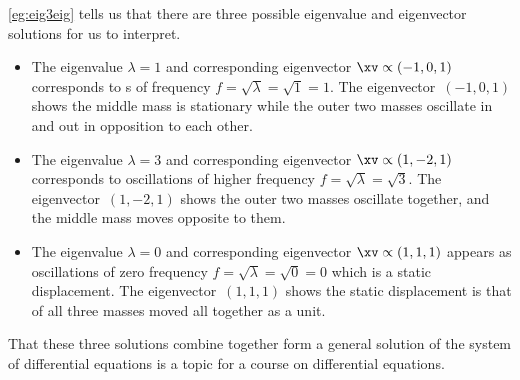 \begin{reduce}
\begin{example}
\cref{eg:eig3eig} tells us that there are three possible eigenvalue and eigenvector solutions for us to interpret.
\begin{itemize}
\item The eigenvalue \(\lambda=1\) and corresponding eigenvector \(\xv\propto(-1,0,1)\) corresponds to s of frequency \(f=\sqrt\lambda=\sqrt 1=1\).
The eigenvector~\((-1,0,1)\) shows the middle mass is stationary while the outer two masses oscillate in and out in opposition to each other.
\item The eigenvalue \(\lambda=3\) and corresponding eigenvector \(\xv\propto(1,-2,1)\) corresponds to oscillations of higher frequency \(f=\sqrt\lambda=\sqrt 3\).
The eigenvector~\((1,-2,1)\) shows the outer two masses oscillate together, and the middle mass moves opposite to them.
\item The eigenvalue \(\lambda=0\) and corresponding eigenvector \(\xv\propto(1,1,1)\) appears as oscillations of zero frequency \(f=\sqrt\lambda=\sqrt 0=0\) which is a static displacement.
The eigenvector~\((1,1,1)\) shows the static displacement is that of all three masses moved all together as a unit.
\end{itemize}
That these three solutions combine together form a general solution of the system of differential equations is a topic for a course on differential equations.
\end{example}
\end{reduce}




